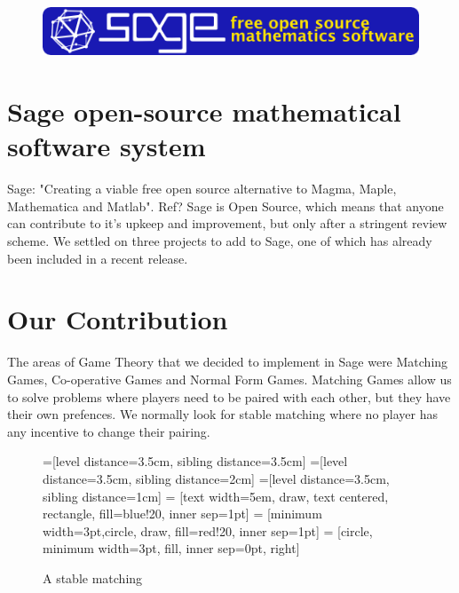 \documentclass[a0,landscape]{a0poster}
\begin{document}
\vspace{1cm}
\begin{multicols}{3}


\begin{figure}[H]
\centering
\includegraphics[width=0.9\linewidth]{Images/sage-banner-02.png}
\end{figure}

\color{Brown}
\section*{Sage open-source mathematical software system}
Sage: "Creating a viable free open source alternative to Magma, Maple, Mathematica and Matlab".
Ref?
Sage is Open Source, which means that anyone can contribute to it's upkeep and improvement, but only after a stringent review scheme.
We settled on three projects to add to Sage, one of which has already been included in a recent release.

\section*{Our Contribution}
The areas of Game Theory that we decided to implement in Sage were Matching Games, Co-operative Games and Normal Form Games.
Matching Games allow us to solve problems where players need to be paired with each other, but they have their own prefences.
We normally look for stable matching where no player has any incentive to change their pairing.

\begin{figure}[H]
\color{Black}
\centering
{}=[level distance=3.5cm, sibling distance=3.5cm]
=[level distance=3.5cm, sibling distance=2cm]
=[level distance=3.5cm, sibling distance=1cm]
 = [text width=5em, draw, text centered, rectangle, fill=blue!20, inner sep=1pt]
 = [minimum width=3pt,circle,  draw, fill=red!20, inner sep=1pt]
 = [circle, minimum width=3pt, fill, inner sep=0pt, right]
\caption{A stable matching}
\label{fig:matching_game}
\end{figure}


\end{multicols}
\end{document}

